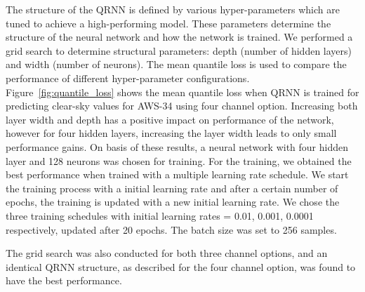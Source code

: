 \documentclass[12pt]{article}
\begin{document}
The structure of the QRNN is defined by various hyper-parameters which are tuned to achieve a high-performing model. These parameters determine the structure of the neural network and how the network is trained. We performed a grid search to determine structural parameters: depth (number of hidden layers) and width (number of neurons). The mean quantile loss is used to compare the performance of different hyper-parameter configurations. Figure~\ref{fig:quantile_loss} shows the mean quantile loss when QRNN is trained for predicting clear-sky values for AWS-34 using four channel option. Increasing both layer width and depth has a positive impact on performance of the network, however for four hidden layers, increasing the layer width leads to only small performance gains. On basis of these results, a neural network with four hidden layer and 128 neurons was chosen for training. For the training, we obtained the best performance when trained with a multiple learning rate schedule. We start the training process with a initial learning rate and after a certain number of epochs, the training is updated with a new initial learning rate. We chose the three training schedules with initial learning rates = 0.01, 0.001, 0.0001 respectively, updated after 20 epochs. The batch size was set to 256 samples. 

The grid search was also conducted for both three channel options, and an identical QRNN structure, as described for the four channel option, was found to have the best performance. 
%

%
\end{document}
